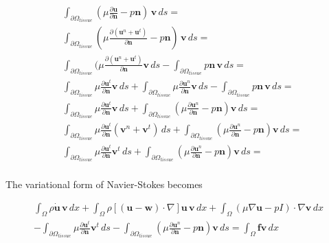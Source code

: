 \documentclass[11pt,a4paper,titlepage]{report}
\begin{document}
\begin{align*}
& \int_{\partial \Omega_{tissue}} (\mu \frac{\partial \mathbf{u}}{\partial \mathbf{n}} -  p \mathbf{n}) \, \mathbf{v} \, ds = \\
& \int_{\partial \Omega_{tissue}} (\mu \frac{\partial (\mathbf{u}^n + \mathbf{u}^t)}{\partial \mathbf{n}} -  p \mathbf{n}) \, \mathbf{v} \, ds = \\
& \int_{\partial \Omega_{tissue}} (\mu \frac{\partial (\mathbf{u}^n + \mathbf{u}^t)  }{\partial \mathbf{n}} \mathbf{v} \,ds - \int_{\partial \Omega_{tissue}} p \mathbf{n} \, \mathbf{v} \, ds = \\
& \int_{\partial \Omega_{tissue}} \mu \frac{\partial \mathbf{u}^t}{\partial \mathbf{n}} \mathbf{v} \, ds
+ \int_{\partial \Omega_{tissue}} \mu \frac{\partial \mathbf{u}^n}{\partial \mathbf{n}} \mathbf{v} \, ds
- \int_{\partial \Omega_{tissue}} p \mathbf{n} \, \mathbf{v} \, ds = \\
& \int_{\partial \Omega_{tissue}} \mu \frac{\partial \mathbf{u}^t}{\partial \mathbf{n}} \mathbf{v} \, ds 
+ \int_{\partial \Omega_{tissue}} ( \mu \frac{\partial \mathbf{u}^n}{\partial \mathbf{n}} - p \mathbf{n} ) \mathbf{v} \, ds = \\
& \int_{\partial \Omega_{tissue}} \mu \frac{\partial \mathbf{u}^t}{\partial \mathbf{n}} (\mathbf{v}^n + \mathbf{v}^t) \, ds 
+ \int_{\partial \Omega_{tissue}} ( \mu \frac{\partial \mathbf{u}^n}{\partial \mathbf{n}} - p \mathbf{n} ) \mathbf{v} \, ds = \\
& \int_{\partial \Omega_{tissue}} \mu \frac{\partial \mathbf{u}^t}{\partial \mathbf{n}} \mathbf{v}^t \, ds 
+ \int_{\partial \Omega_{tissue}} ( \mu \frac{\partial \mathbf{u}^n}{\partial \mathbf{n}} - p \mathbf{n} ) \mathbf{v} \, ds = \\
\end{align*}


The variational form of Navier-Stokes becomes

\begin{align*}
 \int_{\Omega} \rho \dot{\mathbf{u}} \, \mathbf{v} \, dx
+ \int_{\Omega} \rho [(\mathbf{u - w}) \cdot \nabla] \mathbf{u} \, \mathbf{v} \, dx
+ \int_{\Omega} (\mu \nabla \mathbf{u} - pI) \cdot \nabla \mathbf{v} \, dx \\
- \int_{\partial \Omega_{tissue}} \mu \frac{\partial \mathbf{u}^t}{\partial \mathbf{n}} \mathbf{v}^t \, ds 
- \int_{\partial \Omega_{tissue}} ( \mu \frac{\partial \mathbf{u}^n}{\partial \mathbf{n}} - p \mathbf{n} ) \mathbf{v} \, ds
= \int_{\Omega} \mathbf{f} \mathbf{v} \, dx
\end{align*}
\end{document}
